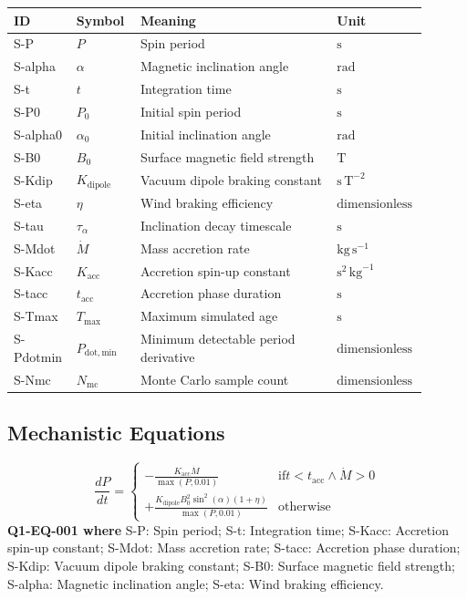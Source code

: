 \documentclass[11pt]{article}
\begin{document}
\begin{center}
\small
\begin{tabular}{|p{0.12\linewidth}|p{0.15\linewidth}|p{0.46\linewidth}|p{0.17\linewidth}|}
\hline
ID & Symbol & Meaning & Unit \\ \hline
S-P & $P$ & Spin period & $\mathrm{s}$ \\ \hline
S-alpha & $\alpha$ & Magnetic inclination angle & $\mathrm{rad}$ \\ \hline
S-t & $t$ & Integration time & $\mathrm{s}$ \\ \hline
S-P0 & $P_0$ & Initial spin period & $\mathrm{s}$ \\ \hline
S-alpha0 & $\alpha_0$ & Initial inclination angle & $\mathrm{rad}$ \\ \hline
S-B0 & $B_0$ & Surface magnetic field strength & $\mathrm{T}$ \\ \hline
S-Kdip & $K_{\mathrm{dipole}}$ & Vacuum dipole braking constant & $\mathrm{s}\,\mathrm{T}^{-2}$ \\ \hline
S-eta & $\eta$ & Wind braking efficiency & $\mathrm{dimensionless}$ \\ \hline
S-tau & $\tau_\alpha$ & Inclination decay timescale & $\mathrm{s}$ \\ \hline
S-Mdot & $\dot{M}$ & Mass accretion rate & $\mathrm{kg}\,\mathrm{s}^{-1}$ \\ \hline
S-Kacc & $K_{\mathrm{acc}}$ & Accretion spin-up constant & $\mathrm{s}^{2}\,\mathrm{kg}^{-1}$ \\ \hline
S-tacc & $t_{\mathrm{acc}}$ & Accretion phase duration & $\mathrm{s}$ \\ \hline
S-Tmax & $T_{\mathrm{max}}$ & Maximum simulated age & $\mathrm{s}$ \\ \hline
S-Pdotmin & $P_{\mathrm{dot,min}}$ & Minimum detectable period derivative & $\mathrm{dimensionless}$ \\ \hline
S-Nmc & $N_{\mathrm{mc}}$ & Monte Carlo sample count & $\mathrm{dimensionless}$ \\ \hline
\end{tabular}
\end{center}

\subsection{Mechanistic Equations}

\begin{equation}\label{eq:Q1-EQ-001}
\frac{dP}{dt} = \begin{cases} -\frac{K_{\mathrm{acc}} \dot{M}}{\max(P, 0.01)} & \mathrm{if} t < t_{\mathrm{acc}} \land \dot{M} > 0 \\ +\frac{K_{\mathrm{dipole}} B_0^2 \sin^2(\alpha)(1+\eta)}{\max(P, 0.01)} & \mathrm{otherwise} \end{cases}
\end{equation}
\noindent\textbf{Q1-EQ-001 where} S-P: Spin period; S-t: Integration time; S-Kacc: Accretion spin-up constant; S-Mdot: Mass accretion rate; S-tacc: Accretion phase duration; S-Kdip: Vacuum dipole braking constant; S-B0: Surface magnetic field strength; S-alpha: Magnetic inclination angle; S-eta: Wind braking efficiency.
\end{document}
